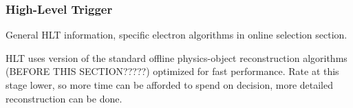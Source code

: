 \subsubsection{High-Level Trigger}
General HLT information, specific electron algorithms in online selection section.  

HLT uses version of the standard offline physics-object reconstruction algorithms (BEFORE THIS SECTION?????) 
optimized for fast performance.  
Rate at this stage lower, so more time can be afforded to spend on decision, 
more detailed reconstruction can be done.  


